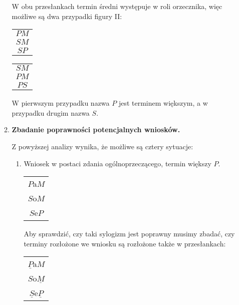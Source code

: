 \documentclass[12pt]{article}
\begin{document}
\begin{itemize}
\begin{enumerate}
			W obu przesłankach termin średni występuje w roli orzecznika, więc możliwe są dwa przypadki figury II:
			\begin{center}
				
						\begin{tabular}{c}
							$PM$ \\ 
							$SM$ \\ 
							\hline 
							$SP$ \\ 
						\end{tabular} 
											\begin{tabular}{c}
						$SM$ \\ 
						$PM$ \\ 
						\hline 
						$PS$ \\ 
					\end{tabular} 
					\end{center}
			
			W pierwszym przypadku nazwa $P$ jest terminem większym, a w przypadku drugim nazwa $S$.
			\item \textbf{Zbadanie poprawności potencjalnych wniosków.}
			
			Z powyższej analizy wynika, że możliwe są cztery sytuacje:
			
			\begin{enumerate}
			\item Wniosek w postaci zdania ogólnoprzeczącego, termin większy $P$. \\
			\begin{center}
				
				\begin{tabular}{c}
					$P$a$M$ \\ 
					$S$o$M$ \\ 
					\hline 
					$S$e$P$ \\ 
				\end{tabular} 
			\end{center}
		
		Aby sprawdzić, czy taki sylogizm jest poprawny musimy zbadać, czy terminy rozłożone we wniosku są rozłożone także w przesłankach:
		\begin{center}
			
			\begin{tabular}{c}
				$\underline{P}$a$M$ \\ 
				$S$o$\underline{M}$ \\ 
				\hline 
				$\underline{S}$e$\underline{P}$ \\ 
			\end{tabular} 
		\end{center}
	

\end{enumerate}
\end{enumerate}
\end{itemize}
\end{document}
